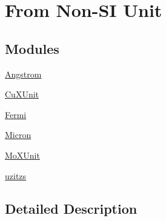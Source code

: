 \hypertarget{group___e_g_x_math-_conversions-_length_conversions-_non-_s_i}{}\section{From Non-\/\+SI Unit}
\label{group___e_g_x_math-_conversions-_length_conversions-_non-_s_i}
\subsection*{Modules}
\begin{DoxyCompactItemize}
\item 
\mbox{\hyperlink{group___e_g_x_math-_conversions-_length_conversions-_non-_s_i-_angstrom}{Angstrom}}
\item 
\mbox{\hyperlink{group___e_g_x_math-_conversions-_length_conversions-_non-_s_i-_cu_x_unit}{Cu\+X\+Unit}}
\item 
\mbox{\hyperlink{group___e_g_x_math-_conversions-_length_conversions-_non-_s_i-_fermi}{Fermi}}
\item 
\mbox{\hyperlink{group___e_g_x_math-_conversions-_length_conversions-_non-_s_i-_micron}{Micron}}
\item 
\mbox{\hyperlink{group___e_g_x_math-_conversions-_length_conversions-_non-_s_i-_mo_x_unit}{Mo\+X\+Unit}}
\item 
\mbox{\hyperlink{group___e_g_x_math-_conversions-_length_conversions-_non-_s_i-uzitzs}{uzitzs}}
\end{DoxyCompactItemize}


\subsection{Detailed Description}

